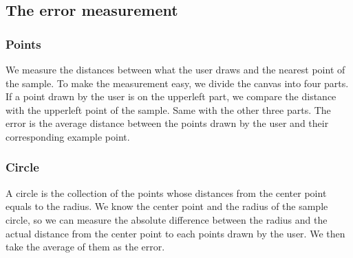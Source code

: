 \subsection{The error measurement}
\subsubsection{Points}
We measure the distances between what the user draws and the nearest point of the sample.
To make the measurement easy, we divide the canvas into four parts.
If a point drawn by the user is on the upperleft part, we compare the distance with the upperleft point of the sample. Same with the other three parts. The error is the average distance between the points drawn by the user and their corresponding example point. 
\subsubsection{Circle}
A circle is the collection of the points whose distances from the center point equals to the radius.
We know the center point and the radius of the sample circle, so we can measure the absolute difference between the radius and the actual distance from the center point to each points drawn by the user. We then take the average of them as the error.

